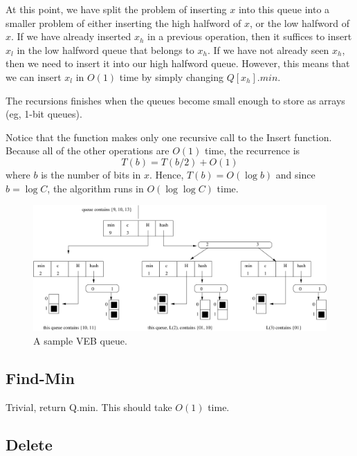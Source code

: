 \documentclass{article}[10pt]
\begin{document}
At this point, we have split the problem of inserting $x$ into
this queue into a smaller problem of either inserting the high
halfword of $x$, or the low halfword of $x$.  If we have already
inserted $x_h$ in a previous operation, then it suffices to insert
$x_l$ in the low halfword queue that belongs to $x_h$.  If we have not
already seen $x_h$, then we need to insert it into our high halfword
queue.  However, this means that we can insert $x_l$ in $O(1)$ time
by simply changing $Q[x_h].min$.

The recursions finishes when the queues become small enough to
store as arrays (eg, 1-bit queues).

Notice that the function
makes only one recursive call to the {\sc Insert} function.  
Because all of the other operations are $O(1)$ time, the recurrence is
$$ T(b) = T(b/2) + O(1) $$
where $b$ is the number of bits in $x$.  Hence, $T(b) = O(\log b)$ and
since $b = \log C$, the algorithm runs in $O(\log \log C)$ time.


\begin{figure}[h]
\begin{center}
  \includegraphics{veb.png}
\caption{A sample VEB queue.}
\label{fig:picture}
\end{center}
\end{figure}

\subsection{Find-Min}

Trivial, return Q.min.  This should take $O(1)$ time.

\subsection{Delete}
\end{document}
